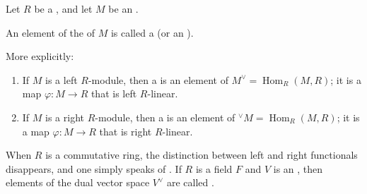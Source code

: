 \begin{definition} \label{definition:functional_on_a_module_over_a_ring}
    Let $R$ be a , and let $M$ be an .

    An element of the  of $M$ is called a  (or an ).

    More explicitly:
    \begin{enumerate}
        \item If $M$ is a left $R$-module, then a  is an element of $M^\vee = \operatorname{Hom}_R(M, R)$; it is a map $\varphi: M \to R$ that is left $R$-linear.

        \item If $M$ is a right $R$-module, then a  is an element of ${}^\vee M = \operatorname{Hom}_R(M, R)$; it is a map $\varphi: M \to R$ that is right $R$-linear.
    \end{enumerate}

    When $R$ is a commutative ring, the distinction between left and right functionals disappears, and one simply speaks of . If $R$ is a field $F$ and $V$ is an , then elements of the dual vector space $V^\vee$ are called .
\end{definition}

